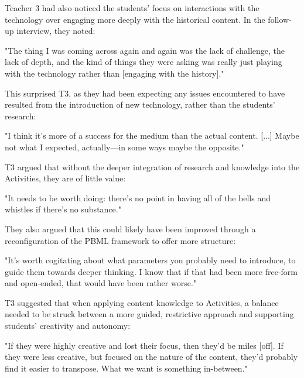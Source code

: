 Teacher 3 had also noticed the students' focus on interactions with the technology over engaging more deeply with the historical content. In the follow-up interview, they noted: 

\begin{displayquote}
"The thing I was coming across again and again was the lack of challenge, the lack of depth, and the kind of things they were asking was really just playing with the technology rather than [engaging with the history]."
\end{displayquote}

This surprised T3, as they had been expecting any issues encountered to have resulted from the introduction of new technology, rather than the students' research: 

\begin{displayquote}
"I think it's more of a success for the medium than the actual content. [...] Maybe not what I expected, actually---in some ways maybe the opposite."
\end{displayquote}

T3 argued that without the deeper integration of research and knowledge into the Activities, they are of little value: 

\begin{displayquote}
"It needs to be worth doing: there's no point in having all of the bells and whistles if there's no substance."
\end{displayquote}

They also argued that this could likely have been improved through a reconfiguration of the PBML framework to offer more structure: 

\begin{displayquote}
"It's worth cogitating about what parameters you probably need to introduce, to guide them towards deeper thinking. I know that if that had been more free-form and open-ended, that would have been rather worse."
\end{displayquote}

T3 suggested that when applying content knowledge to Activities, a balance needed to be struck between a more guided, restrictive approach and supporting students' creativity and autonomy:

\begin{displayquote}
"If they were highly creative and lost their focus, then they'd be miles [off]. If they were less creative, but focused on the nature of the content, they'd probably find it easier to transpose. What we want is something in-between."
\end{displayquote}

